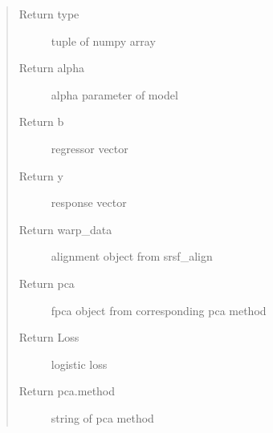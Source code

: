 \documentclass[letterpaper,10pt,english]{sphinxmanual}
\begin{document}
\begin{fulllineitems}
\begin{quote}
\begin{description}
\item[{Return type}] \leavevmode
tuple of numpy array

\item[{Return alpha}] \leavevmode
alpha parameter of model

\item[{Return b}] \leavevmode
regressor vector

\item[{Return y}] \leavevmode
response vector

\item[{Return warp\_data}] \leavevmode
alignment object from srsf\_align

\item[{Return pca}] \leavevmode
fpca object from corresponding pca method

\item[{Return Loss}] \leavevmode
logistic loss

\item[{Return pca.method}] \leavevmode
string of pca method

\end{description}\end{quote}

\end{fulllineitems}

\end{document}
